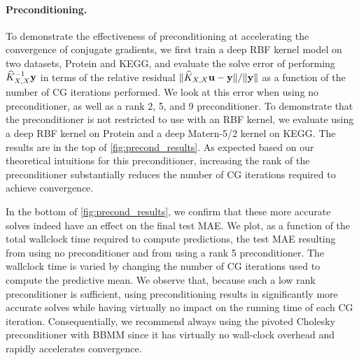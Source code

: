 \paragraph{Preconditioning.}
To demonstrate the effectiveness of preconditioning at accelerating the convergence of conjugate gradients, we first train a deep RBF kernel model on two datasets, Protein and KEGG, and evaluate the solve error of performing $\widehat{K}_{X,X}^{-1}\mathbf{y}$ in terms of the relative residual $\Vert \widehat{K}_{X,X}\mathbf{u} - \mathbf{y} \Vert / \Vert \mathbf{y} \Vert$ as a function of the number of CG iterations performed.
We look at this error when using no preconditioner, as well as a rank 2, 5, and 9 preconditioner.
To demonstrate that the preconditioner is not restricted to use with an RBF kernel, we evaluate using a deep RBF kernel on Protein and a deep Matern-5/2 kernel on KEGG.
The results are in the top of \autoref{fig:precond_results}.
As expected based on our theoretical intuitions for this preconditioner, increasing the rank of the preconditioner substantially reduces the number of CG iterations required to achieve convergence.

In the bottom of \autoref{fig:precond_results}, we confirm that these more accurate solves indeed have an effect on the final test MAE.
We plot, as a function of the total wallclock time required to compute predictions, the test MAE resulting from using no preconditioner and from using a rank 5 preconditioner.
The wallclock time is varied by changing the number of CG iterations used to compute the predictive mean.
We observe that, because such a low rank preconditioner is sufficient, using preconditioning results in significantly more accurate solves while having virtually no impact on the running time of each CG iteration.
Consequentially, we recommend always using the pivoted Cholesky preconditioner with BBMM since it has virtually no wall-clock overhead and rapidly accelerates convergence.
